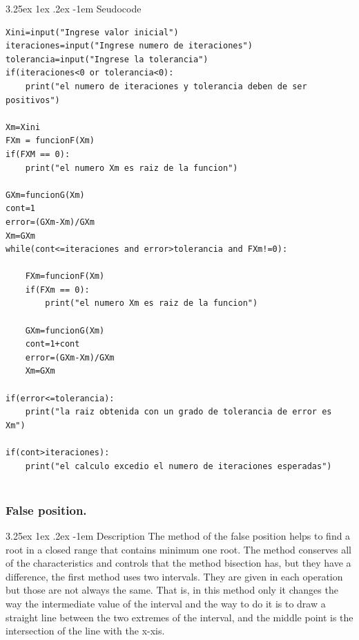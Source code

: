 \documentclass{article}
\makeatletter
\renewcommand\paragraph{\@startsection{paragraph}{5}{\z@}%
  {3.25ex \@plus1ex \@minus.2ex}%
  {-1em}%
  {\normalfont\normalsize\bfseries}}
\makeatother
\begin{document}
\paragraph{Seudocode}
\hfill \break
\begin{lstlisting}
Xini=input("Ingrese valor inicial")
iteraciones=input("Ingrese numero de iteraciones")
tolerancia=input("Ingrese la tolerancia")
if(iteraciones<0 or tolerancia<0):
	print("el numero de iteraciones y tolerancia deben de ser positivos")

Xm=Xini
FXm = funcionF(Xm)
if(FXM == 0):
	print("el numero Xm es raiz de la funcion")

GXm=funcionG(Xm)
cont=1
error=(GXm-Xm)/GXm
Xm=GXm
while(cont<=iteraciones and error>tolerancia and FXm!=0):

    FXm=funcionF(Xm)
    if(FXm == 0):
		print("el numero Xm es raiz de la funcion")

	GXm=funcionG(Xm)
    cont=1+cont
    error=(GXm-Xm)/GXm
    Xm=GXm

if(error<=tolerancia):
    print("la raiz obtenida con un grado de tolerancia de error es Xm")

if(cont>iteraciones):
    print("el calculo excedio el numero de iteraciones esperadas")


\end{lstlisting}

\subsubsection{False position.}

\paragraph{Description}
\hfill \break
The method of the false position helps to find a root in a closed range that contains minimum one root. 
The method conserves all of the characteristics and controls that the method bisection has, but they have a difference, the first method uses two intervals. They are given in each operation but those are not always the same.
That is, in this method only it changes the way the intermediate value of the interval and the way to do it is to draw a straight line between the two extremes of the interval, and the middle point is the intersection of the line with the x-xis.
\end{document}
